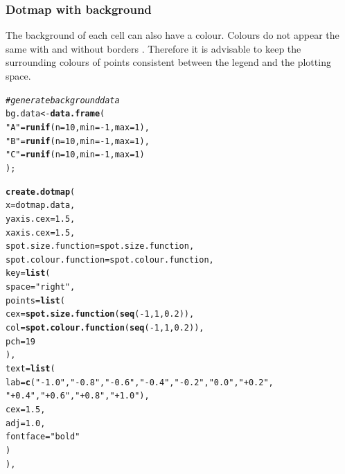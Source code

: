 \documentclass[letterpaper]{article}\usepackage[]{graphicx}\usepackage[]{color}
\makeatletter
\newcommand{\hlnum}[1]{\textcolor[rgb]{0.686,0.059,0.569}{#1}}%
\newcommand{\hlstr}[1]{\textcolor[rgb]{0.192,0.494,0.8}{#1}}%
\newcommand{\hlcom}[1]{\textcolor[rgb]{0.678,0.584,0.686}{\textit{#1}}}%
\newcommand{\hlopt}[1]{\textcolor[rgb]{0,0,0}{#1}}%
\newcommand{\hlstd}[1]{\textcolor[rgb]{0.345,0.345,0.345}{#1}}%
\newcommand{\hlkwb}[1]{\textcolor[rgb]{0.69,0.353,0.396}{#1}}%
\newcommand{\hlkwc}[1]{\textcolor[rgb]{0.333,0.667,0.333}{#1}}%
\newcommand{\hlkwd}[1]{\textcolor[rgb]{0.737,0.353,0.396}{\textbf{#1}}}%
\newenvironment{kframe}{%
 \def\at@end@of@kframe{}%
 \ifinner\ifhmode%
  \def\at@end@of@kframe{\end{minipage}}%
  \begin{minipage}{\columnwidth}%
 \fi\fi%
 \def\FrameCommand##1{\hskip\@totalleftmargin \hskip-\fboxsep
 \colorbox{shadecolor}{##1}\hskip-\fboxsep
     \hskip-\linewidth \hskip-\@totalleftmargin \hskip\columnwidth}%
 \MakeFramed {\advance\hsize-\width
   \@totalleftmargin\z@ \linewidth\hsize
   \@setminipage}}%
 {\par\unskip\endMakeFramed%
 \at@end@of@kframe}
\newenvironment{knitrout}{}{} %
\makeatother
\begin{document}
\subsubsection{Dotmap with background}
The background of each cell can also have a colour. Colours do not appear the same with and without borders \cite{brewer-colour}. Therefore it is advisable to keep the surrounding colours of points consistent between the legend and the plotting space.

\begin{knitrout}
\color{fgcolor}\begin{kframe}
\begin{alltt}
\hlcom{# generate background data}
\hlstd{bg.data} \hlkwb{<-} \hlkwd{data.frame}\hlstd{(}
    \hlstr{"A"} \hlstd{=} \hlkwd{runif}\hlstd{(}\hlkwc{n} \hlstd{=} \hlnum{10}\hlstd{,} \hlkwc{min} \hlstd{=} \hlopt{-}\hlnum{1}\hlstd{,} \hlkwc{max} \hlstd{=} \hlnum{1}\hlstd{),}
    \hlstr{"B"} \hlstd{=} \hlkwd{runif}\hlstd{(}\hlkwc{n} \hlstd{=} \hlnum{10}\hlstd{,} \hlkwc{min} \hlstd{=} \hlopt{-}\hlnum{1}\hlstd{,} \hlkwc{max} \hlstd{=} \hlnum{1}\hlstd{),}
    \hlstr{"C"} \hlstd{=} \hlkwd{runif}\hlstd{(}\hlkwc{n} \hlstd{=} \hlnum{10}\hlstd{,} \hlkwc{min} \hlstd{=} \hlopt{-}\hlnum{1}\hlstd{,} \hlkwc{max} \hlstd{=} \hlnum{1}\hlstd{)}
    \hlstd{);}

\hlkwd{create.dotmap}\hlstd{(}
    \hlkwc{x} \hlstd{= dotmap.data,}
    \hlkwc{yaxis.cex} \hlstd{=} \hlnum{1.5}\hlstd{,}
    \hlkwc{xaxis.cex} \hlstd{=} \hlnum{1.5}\hlstd{,}
    \hlkwc{spot.size.function} \hlstd{= spot.size.function,}
    \hlkwc{spot.colour.function} \hlstd{= spot.colour.function,}
    \hlkwc{key} \hlstd{=} \hlkwd{list}\hlstd{(}
        \hlkwc{space} \hlstd{=} \hlstr{"right"}\hlstd{,}
        \hlkwc{points} \hlstd{=} \hlkwd{list}\hlstd{(}
            \hlkwc{cex} \hlstd{=} \hlkwd{spot.size.function}\hlstd{(}\hlkwd{seq}\hlstd{(}\hlopt{-}\hlnum{1}\hlstd{,} \hlnum{1}\hlstd{,} \hlnum{0.2}\hlstd{)),}
            \hlkwc{col} \hlstd{=} \hlkwd{spot.colour.function}\hlstd{(}\hlkwd{seq}\hlstd{(}\hlopt{-}\hlnum{1}\hlstd{,} \hlnum{1}\hlstd{,} \hlnum{0.2}\hlstd{)),}
            \hlkwc{pch} \hlstd{=} \hlnum{19}
            \hlstd{),}
        \hlkwc{text} \hlstd{=} \hlkwd{list}\hlstd{(}
            \hlkwc{lab} \hlstd{=} \hlkwd{c}\hlstd{(}\hlstr{"-1.0"}\hlstd{,} \hlstr{"-0.8"}\hlstd{,} \hlstr{"-0.6"}\hlstd{,} \hlstr{"-0.4"}\hlstd{,} \hlstr{"-0.2"}\hlstd{,} \hlstr{" 0.0"}\hlstd{,} \hlstr{"+0.2"}\hlstd{,}
                \hlstr{"+0.4"}\hlstd{,} \hlstr{"+0.6"}\hlstd{,} \hlstr{"+0.8"}\hlstd{,} \hlstr{"+1.0"}\hlstd{),}
            \hlkwc{cex} \hlstd{=} \hlnum{1.5}\hlstd{,}
            \hlkwc{adj} \hlstd{=} \hlnum{1.0}\hlstd{,}
            \hlkwc{fontface} \hlstd{=} \hlstr{"bold"}
            \hlstd{)}
        \hlstd{),}


\end{alltt}
\end{kframe}
\end{knitrout}
\end{document}

